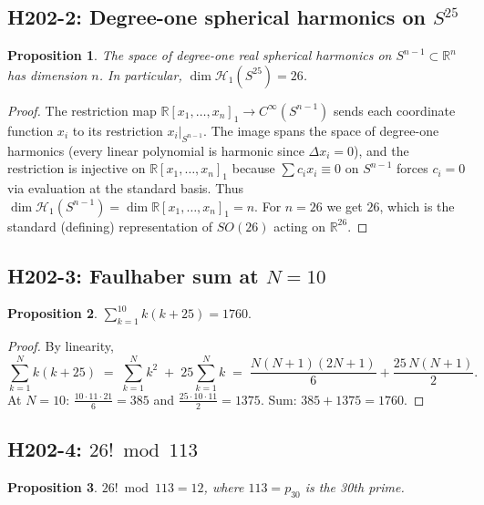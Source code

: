 \documentclass[11pt,letterpaper]{article}
\newtheorem{prop}{Proposition}
\begin{document}
\subsection{H202-2: Degree-one spherical harmonics on $S^{25}$}

\begin{prop}\label{prop:deg1}
The space of degree-one real spherical harmonics on $S^{n-1}\subset\mathbb{R}^n$
has dimension $n$. In particular, $\dim\mathcal{H}_1(S^{25}) = 26$.
\end{prop}

\begin{proof}
The restriction map $\mathbb{R}[x_1,\ldots,x_n]_1 \to C^\infty(S^{n-1})$ sends
each coordinate function $x_i$ to its restriction $x_i|_{S^{n-1}}$. The image
spans the space of degree-one harmonics (every linear polynomial is harmonic
since $\Delta x_i = 0$), and the restriction is injective on
$\mathbb{R}[x_1,\ldots,x_n]_1$ because $\sum c_i x_i \equiv 0$ on $S^{n-1}$
forces $c_i = 0$ via evaluation at the standard basis. Thus
$\dim \mathcal{H}_1(S^{n-1}) = \dim\mathbb{R}[x_1,\ldots,x_n]_1 = n$. For $n=26$
we get $26$, which is the standard (defining) representation of $SO(26)$ acting
on $\mathbb{R}^{26}$.
\end{proof}

\subsection{H202-3: Faulhaber sum at $N=10$}

\begin{prop}\label{prop:faulhaber}
$\displaystyle \sum_{k=1}^{10} k(k+25) = 1760.$
\end{prop}

\begin{proof}
By linearity,
\[
\sum_{k=1}^{N} k(k+25) \;=\; \sum_{k=1}^{N} k^{2} \;+\; 25 \sum_{k=1}^{N} k
\;=\; \frac{N(N+1)(2N+1)}{6} + \frac{25\,N(N+1)}{2}.
\]
At $N=10$: $\frac{10\cdot 11\cdot 21}{6} = 385$ and
$\frac{25\cdot 10 \cdot 11}{2} = 1375$. Sum: $385 + 1375 = 1760$.
\end{proof}

\subsection{H202-4: $26! \bmod 113$}

\begin{prop}\label{prop:fact}
$26!\bmod 113 = 12$, where $113 = p_{30}$ is the 30th prime.
\end{prop}
\end{document}
